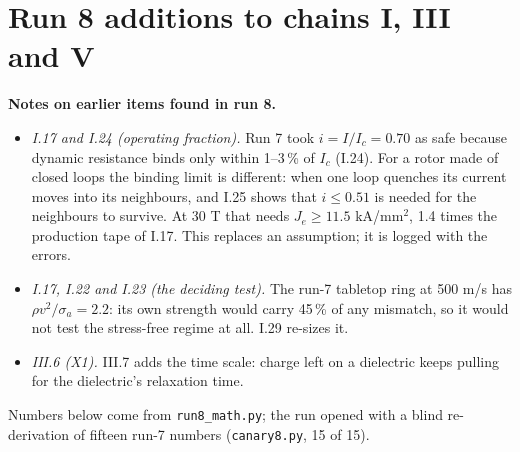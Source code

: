 \section*{Run 8 additions to chains I, III and V}
\noindent\textbf{Notes on earlier items found in run 8.}
\begin{itemize}
\item \emph{I.17 and I.24 (operating fraction).} Run 7 took $i=I/I_c=0.70$ as safe because dynamic resistance binds only within 1--3\,\% of $I_c$
(I.24). For a rotor made of closed loops the binding limit is different: when one loop quenches its current moves into its neighbours, and
I.25 shows that $i\le0.51$ is needed for the neighbours to survive. At 30 T that needs $J_e\ge11.5$ kA/mm$^2$, 1.4 times the production tape of
I.17. This replaces an assumption; it is logged with the errors.
\item \emph{I.17, I.22 and I.23 (the deciding test).} The run-7 tabletop ring at 500 m/s has $\rho v^2/\sigma_a=2.2$: its own strength would
carry 45\,\% of any mismatch, so it would not test the stress-free regime at all. I.29 re-sizes it.
\item \emph{III.6 (X1).} III.7 adds the time scale: charge left on a dielectric keeps pulling for the dielectric's relaxation time.
\end{itemize}
Numbers below come from \texttt{run8\_math.py}; the run opened with a blind re-derivation of fifteen run-7 numbers (\texttt{canary8.py}, 15 of 15).

\setcounter{section}{1}\setcounter{subsection}{24}
